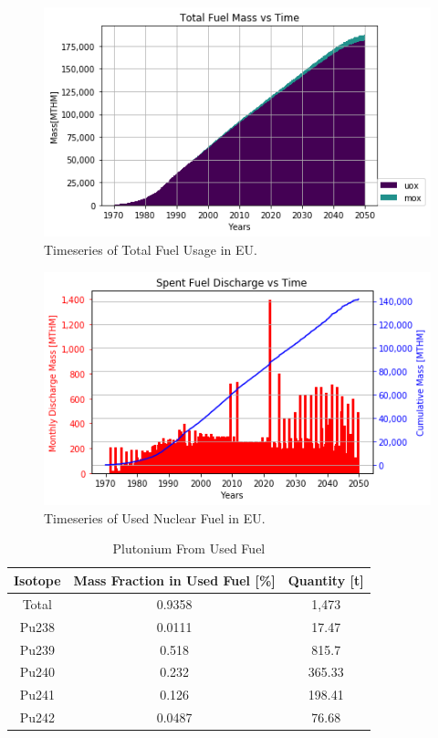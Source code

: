 \begin{figure}[htbp!]
	\begin{center}
		\includegraphics[scale=0.7]{./images/eu_future/total_fuel.png}
	\end{center}
	\caption{Timeseries of Total Fuel Usage in \gls{EU}.}
	\label{fig:eu_fuel}
\end{figure}


\begin{figure}[htbp!]
	\begin{center}
			\includegraphics[scale=0.7]{./images/eu_future/snf_discharge.png}
	\end{center}
	\caption{Timeseries of Used Nuclear Fuel in \gls{EU}.}
	\label{fig:eu_snf}
\end{figure}
\FloatBarrier


\begin{table}[h]
	\centering
	\begin{tabular}{|c|c|c|}
		\hline
		Isotope & Mass Fraction in Used Fuel [\%] & Quantity [t] \\ \hline
		Total & 0.9358 & 1,473 \\ \hline
		Pu238 & 0.0111 & 17.47 \\ \hline
		Pu239 & 0.518 & 815.7 \\ \hline
		Pu240 & 0.232 & 365.33 \\ \hline
		Pu241 & 0.126 & 198.41 \\ \hline
		Pu242 & 0.0487 & 76.68 \\ \hline
	\end{tabular}
	\caption{Plutonium From Used Fuel}
	\label{tab:pu}
\end{table}


